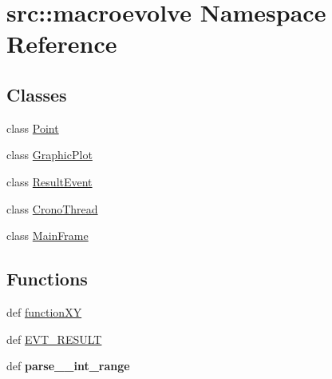 \hypertarget{namespacesrc_1_1macroevolve}{
\section{src::macroevolve Namespace Reference}
\label{namespacesrc_1_1macroevolve}
}
\subsection*{Classes}
\begin{DoxyCompactItemize}
\item 
class \hyperlink{classsrc_1_1macroevolve_1_1Point}{Point}
\item 
class \hyperlink{classsrc_1_1macroevolve_1_1GraphicPlot}{GraphicPlot}
\item 
class \hyperlink{classsrc_1_1macroevolve_1_1ResultEvent}{ResultEvent}
\item 
class \hyperlink{classsrc_1_1macroevolve_1_1CronoThread}{CronoThread}
\item 
class \hyperlink{classsrc_1_1macroevolve_1_1MainFrame}{MainFrame}
\end{DoxyCompactItemize}
\subsection*{Functions}
\begin{DoxyCompactItemize}
\item 
def \hyperlink{namespacesrc_1_1macroevolve_a831a62c1926422aaab0b2d3098fd56c1}{functionXY}
\item 
def \hyperlink{namespacesrc_1_1macroevolve_aab0c174be72cd5fcc21b60d327be2043}{EVT\_\-RESULT}
\item 
\hypertarget{namespacesrc_1_1macroevolve_a6eeb2969126732619a4cd234088680ce}{
def {\bfseries parse\_\_\-int\_\-range}}
\label{namespacesrc_1_1macroevolve_a6eeb2969126732619a4cd234088680ce}

\end{DoxyCompactItemize}
